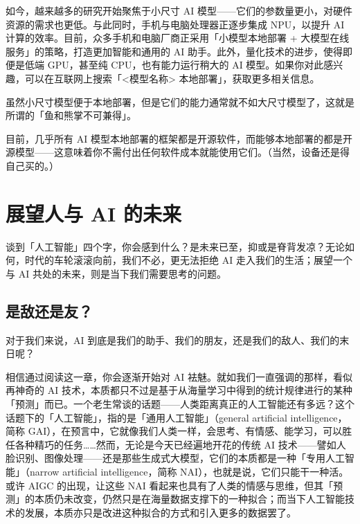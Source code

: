 如今，越来越多的研究开始聚焦于小尺寸 AI 模型——它们的参数量更小，对硬件资源的需求也更低。与此同时，手机与电脑处理器正逐步集成 NPU，以提升 AI 计算的效率。目前，众多手机和电脑厂商正采用「小模型本地部署 + 大模型在线服务」的策略，打造更加智能和通用的 AI 助手。此外，量化技术的进步，使得即便是低端 GPU，甚至纯 CPU，也有能力运行稍大的 AI 模型。如果你对此感兴趣，可以在互联网上搜索「<模型名称> 本地部署」，获取更多相关信息。

\begin{note}
  虽然小尺寸模型便于本地部署，但是它们的能力通常就不如大尺寸模型了，这就是所谓的「鱼和熊掌不可兼得」。
\end{note}

\begin{dangerbox}
  目前，几乎所有 AI 模型本地部署的框架都是开源软件，而能够本地部署的都是开源模型——这意味着你不需付出任何软件成本就能使用它们。（当然，设备还是得自己买的。）
\end{dangerbox}

\section{展望人与 AI 的未来}

谈到「人工智能」四个字，你会感到什么？是未来已至，抑或是脊背发凉？无论如何，时代的车轮滚滚向前，我们不必，更无法拒绝 AI 走入我们的生活；展望一个与 AI 共处的未来，则是当下我们需要思考的问题。

\subsection{是敌还是友？}

对于我们来说，AI 到底是我们的助手、我们的朋友，还是我们的敌人、我们的末日呢？

相信通过阅读这一章，你会逐渐开始对 AI 袪魅。就如我们一直强调的那样，看似再神奇的 AI 技术，本质都只不过是基于从海量学习中得到的统计规律进行的某种「预测」而已。一个老生常谈的话题——人类距离真正的人工智能还有多远？这个话题下的「人工智能」，指的是「通用人工智能」（general artificial intelligence，简称 GAI），在预言中，它就像我们人类一样，会思考、有情感、能学习，可以胜任各种精巧的任务……然而，无论是今天已经遍地开花的传统 AI 技术——譬如人脸识别、图像处理——还是那些生成式大模型，它们的本质都是一种「专用人工智能」（narrow artificial intelligence，简称 NAI），也就是说，它们只能干一种活。或许 AIGC 的出现，让这些 NAI 看起来也具有了人类的情感与思维，但其「预测」的本质仍未改变，仍然只是在海量数据支撑下的一种拟合；而当下人工智能技术的发展，本质亦只是改进这种拟合的方式和引入更多的数据罢了。

